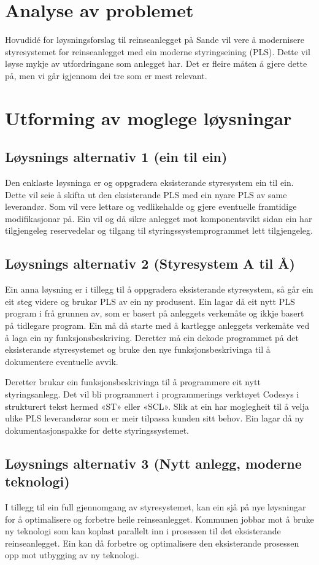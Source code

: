 \section{Analyse av problemet}
Hovudidé for løysningsforslag til reinseanlegget på Sande vil vere å modernisere 
styresystemet for reinseanlegget med ein moderne styringseining (PLS). 
Dette vil løyse mykje av utfordringane som anlegget har. Det er fleire måten å gjere dette på, 
men vi går igjennom dei tre som er mest relevant.

\section{Utforming av moglege løysningar}

\subsection{Løysnings alternativ 1 (ein til ein)}
Den enklaste løysninga er og oppgradera eksisterande styresystem ein til ein. 
Dette vil seie å skifta ut den eksisterande PLS med ein nyare PLS av same leverandør. 
Som vil vere lettare og vedlikehalde og gjere eventuelle framtidige modifikasjonar på. 
Ein vil og då sikre anlegget mot komponentsvikt sidan ein har tilgjengeleg reservedelar 
og tilgang til styringssystemprogrammet lett tilgjengeleg.

\subsection{Løysnings alternativ 2 (Styresystem A til Å)}
Ein anna løysning er i tillegg til å oppgradera eksisterande styresystem, så går ein eit steg videre og brukar PLS av ein ny produsent. 
Ein lagar då eit nytt PLS program i frå grunnen av, som er basert på anleggets verkemåte og ikkje basert på tidlegare program.
Ein må då starte med å kartlegge anleggets verkemåte ved å laga ein ny funksjonsbeskriving. 
Deretter må ein dekode programmet på det eksisterande styresystemet og bruke den nye funksjonsbeskrivinga til å dokumentere eventuelle avvik.


Deretter brukar ein funksjonsbeskrivinga til å programmere eit nytt styringsanlegg. 
Det vil bli programmert i programmerings verktøyet Codesys i strukturert tekst hermed «ST» eller «SCL». 
Slik at ein har moglegheit til å velja ulike PLS leverandørar som er meir tilpassa kunden sitt behov. 
Ein lagar då ny dokumentasjonspakke for dette styringssystemet.

\subsection{Løysnings alternativ 3 (Nytt anlegg, moderne teknologi)}
I tillegg til ein full gjennomgang av styresystemet, 
kan ein sjå på nye løysningar for å optimalisere og forbetre heile reinseanlegget.
Kommunen jobbar mot å bruke ny teknologi som kan koplast parallelt inn i prosessen til det eksisterande reinseanlegget.
Ein kan då forbetre og optimalisere den eksisterande prosessen opp mot utbygging av ny teknologi.